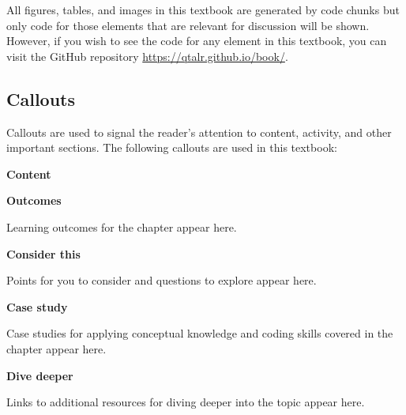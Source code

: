 \documentclass[
  letterpaper,
]{latex/krantz}
\begin{document}
All figures, tables, and images in this textbook are generated by code
chunks but only code for those elements that are relevant for discussion
will be shown. However, if you wish to see the code for any element in
this textbook, you can visit the GitHub repository
\url{https://qtalr.github.io/book/}.

\hypertarget{callouts}{%
\subsection*{Callouts}\label{callouts}}

Callouts are used to signal the reader's attention to content, activity,
and other important sections. The following callouts are used in this
textbook:

\textbf{Content}

\begin{tcolorbox}[enhanced jigsaw, left=2mm, arc=.35mm, colback=white, rightrule=.15mm, toprule=.15mm, breakable, leftrule=.75mm, opacityback=0, bottomrule=.15mm]

\textbf{ Outcomes}

Learning outcomes for the chapter appear here.

\end{tcolorbox}

\begin{tcolorbox}[enhanced jigsaw, left=2mm, arc=.35mm, colback=white, rightrule=.15mm, toprule=.15mm, breakable, leftrule=.75mm, opacityback=0, bottomrule=.15mm]

\textbf{ Consider this}

Points for you to consider and questions to explore appear here.

\end{tcolorbox}

\begin{tcolorbox}[enhanced jigsaw, left=2mm, arc=.35mm, colback=white, rightrule=.15mm, toprule=.15mm, breakable, leftrule=.75mm, opacityback=0, bottomrule=.15mm]

\textbf{ Case study}

Case studies for applying conceptual knowledge and coding skills covered
in the chapter appear here.

\end{tcolorbox}

\begin{tcolorbox}[enhanced jigsaw, left=2mm, arc=.35mm, colback=white, rightrule=.15mm, toprule=.15mm, breakable, leftrule=.75mm, opacityback=0, bottomrule=.15mm]

\textbf{ Dive deeper}

Links to additional resources for diving deeper into the topic appear
here.

\end{tcolorbox}
\end{document}
